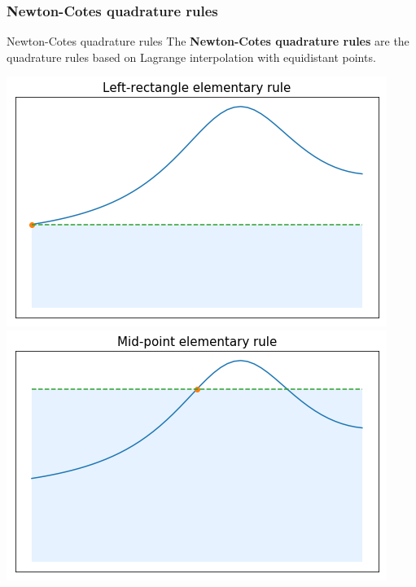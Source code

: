 \documentclass{article}
\begin{document}
        \vspace{10pt}

        \subsubsection{Newton-Cotes quadrature rules}

        \begin{definition}{Newton-Cotes quadrature rules}
            The \textbf{Newton-Cotes quadrature rules} are the quadrature rules based on Lagrange interpolation with equidistant points.
        \end{definition}

        \vspace{10pt}
        
        \includegraphics[scale=0.23]{RectL_Elem.png}
        \hspace{16pt}
        \includegraphics[scale=0.23]{MP_Elem.png}
        \hspace{16pt}
\end{document}

